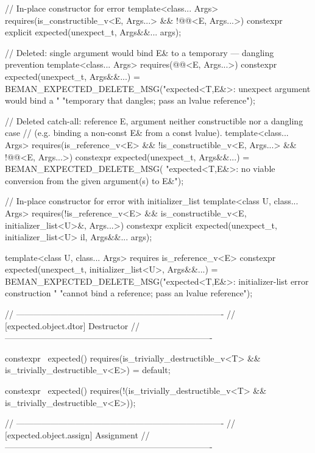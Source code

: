 \begin{codeblock}
{  // In-place constructor for error
  template<class... Args>
    requires(is_constructible_v<E, Args...> && !@@<E, Args...>)
  constexpr explicit expected(unexpect_t, Args&&... args);

  // Deleted: single argument would bind E& to a temporary — dangling prevention
  template<class... Args>
    requires(@@<E, Args...>)
  constexpr expected(unexpect_t, Args&&...) =
      BEMAN_EXPECTED_DELETE_MSG("expected<T,E&>: unexpect argument would bind a "
                                "temporary that dangles; pass an lvalue reference");

  // Deleted catch-all: reference E, argument neither constructible nor a dangling case
  // (e.g. binding a non-const E& from a const lvalue).
  template<class... Args>
    requires(is_reference_v<E> && !is_constructible_v<E, Args...> &&
             !@@<E, Args...>)
  constexpr expected(unexpect_t, Args&&...) = BEMAN_EXPECTED_DELETE_MSG(
      "expected<T,E&>: no viable conversion from the given argument(s) to E&");

  // In-place constructor for error with initializer_list
  template<class U, class... Args>
    requires(!is_reference_v<E> && is_constructible_v<E, initializer_list<U>&, Args...>)
  constexpr explicit expected(unexpect_t, initializer_list<U> il, Args&&... args);

  template<class U, class... Args>
    requires is_reference_v<E>
  constexpr expected(unexpect_t, initializer_list<U>, Args&&...) =
      BEMAN_EXPECTED_DELETE_MSG("expected<T,E&>: initializer-list error construction "
                                "cannot bind a reference; pass an lvalue reference");

  // -------------------------------------------------------------------------
  // [expected.object.dtor] Destructor
  // -------------------------------------------------------------------------

  constexpr ~expected()
    requires(is_trivially_destructible_v<T> && is_trivially_destructible_v<E>)
  = default;

  constexpr ~expected()
    requires(!(is_trivially_destructible_v<T> && is_trivially_destructible_v<E>));

  // -------------------------------------------------------------------------
  // [expected.object.assign] Assignment
  // -------------------------------------------------------------------------

}
\end{codeblock}
